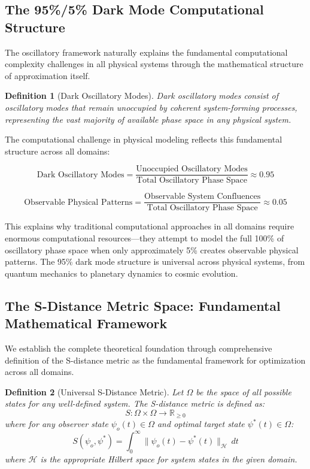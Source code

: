 \documentclass[12pt,a4paper]{article}
\newtheorem{definition}{Definition}
\begin{document}
\subsection{The 95\%/5\% Dark Mode Computational Structure}

The oscillatory framework naturally explains the fundamental computational complexity challenges in all physical systems through the mathematical structure of approximation itself.

\begin{definition}[Dark Oscillatory Modes]
Dark oscillatory modes consist of oscillatory modes that remain unoccupied by coherent system-forming processes, representing the vast majority of available phase space in any physical system.
\end{definition}

The computational challenge in physical modeling reflects this fundamental structure across all domains:

\begin{equation}
\text{Dark Oscillatory Modes} = \frac{\text{Unoccupied Oscillatory Modes}}{\text{Total Oscillatory Phase Space}} \approx 0.95
\end{equation}

\begin{equation}
\text{Observable Physical Patterns} = \frac{\text{Observable System Confluences}}{\text{Total Oscillatory Phase Space}} \approx 0.05
\end{equation}

This explains why traditional computational approaches in all domains require enormous computational resources—they attempt to model the full 100\% of oscillatory phase space when only approximately 5\% creates observable physical patterns. The 95\% dark mode structure is universal across physical systems, from quantum mechanics to planetary dynamics to cosmic evolution.

\subsection{The S-Distance Metric Space: Fundamental Mathematical Framework}

We establish the complete theoretical foundation through comprehensive definition of the S-distance metric as the fundamental framework for optimization across all domains.

\begin{definition}[Universal S-Distance Metric]
Let $\Omega$ be the space of all possible states for any well-defined system. The S-distance metric is defined as:
\begin{equation}
S: \Omega \times \Omega \to \mathbb{R}_{\geq 0}
\end{equation}
where for any observer state $\psi_o(t) \in \Omega$ and optimal target state $\psi^*(t) \in \Omega$:
\begin{equation}
S(\psi_o, \psi^*) = \int_0^{\infty} \|\psi_o(t) - \psi^*(t)\|_{\mathcal{H}} \, dt
\end{equation}
where $\mathcal{H}$ is the appropriate Hilbert space for system states in the given domain.
\end{definition}
\end{document}
